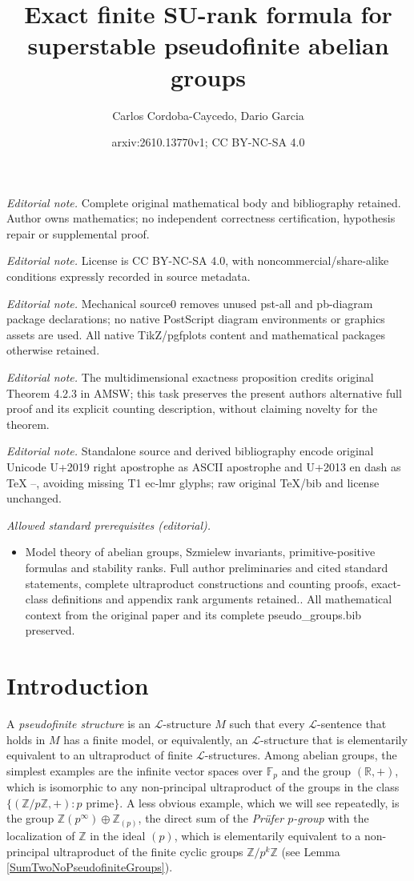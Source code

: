 \documentclass[10pt,a4paper]{amsart}
\title{Exact finite SU-rank formula for superstable pseudofinite abelian groups}
\author{Carlos Cordoba-Caycedo, Dario Garcia}
\date{arxiv:2610.13770v1; CC BY-NC-SA 4.0}
\theoremstyle{definition}
\newcommand{\Le}{\mathcal{L}}
\begin{document}
\maketitle
\noindent\textit{Editorial note.} Complete original mathematical body and bibliography retained. Author owns mathematics; no independent correctness certification, hypothesis repair or supplemental proof.\par\medskip
\noindent\textit{Editorial note.} License is CC BY-NC-SA 4.0, with noncommercial/share-alike conditions expressly recorded in source metadata.\par\medskip
\noindent\textit{Editorial note.} Mechanical source0 removes unused pst-all and pb-diagram package declarations; no native PostScript diagram environments or graphics assets are used. All native TikZ/pgfplots content and mathematical packages otherwise retained.\par\medskip
\noindent\textit{Editorial note.} The multidimensional exactness proposition credits original Theorem 4.2.3 in AMSW; this task preserves the present authors alternative full proof and its explicit counting description, without claiming novelty for the theorem.\par\medskip
\noindent\textit{Editorial note.} Standalone source and derived bibliography encode original Unicode U+2019 right apostrophe as ASCII apostrophe and U+2013 en dash as TeX --, avoiding missing T1 ec-lmr glyphs; raw original TeX/bib and license unchanged.\par\medskip
\noindent\textit{Allowed standard prerequisites (editorial).}\begin{itemize}
\item Model theory of abelian groups, Szmielew invariants, primitive-positive formulas and stability ranks. Full author preliminaries and cited standard statements, complete ultraproduct constructions and counting proofs, exact-class definitions and appendix rank arguments retained.. All mathematical context from the original paper and its complete pseudo\_groups.bib preserved.
\end{itemize}\medskip
\section{Introduction}

A \emph{pseudofinite structure} is an $\Le$-structure $M$ such that every
$\Le$-sentence that holds in $M$ has a finite model, or equivalently, an
$\Le$-structure that is elementarily equivalent to an ultraproduct of finite
$\Le$-structures. Among abelian groups, the simplest examples are the infinite vector
spaces over $\mathbb{F}_p$ and the group $(\mathbb{R},+)$, which is
isomorphic to any non-principal ultraproduct of the groups in the class
$\{(\mathbb{Z}/p\mathbb{Z},+) : p \text{ prime}\}$. A less obvious example,
which we will see repeatedly, is the group
$\mathbb{Z}(p^\infty)\oplus\mathbb{Z}_{(p)}$, the direct sum of the \emph{Prüfer $p$-group} with the localization of $\mathbb{Z}$ in the ideal $(p)$, which is elementarily
equivalent to a non-principal ultraproduct of the finite cyclic groups
$\mathbb{Z}/p^k\mathbb{Z}$ (see Lemma \ref{SumTwoNoPseudofiniteGroups}).\\
\end{document}
